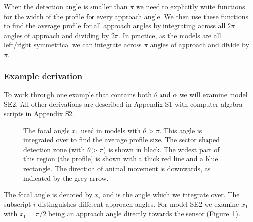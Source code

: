 \documentclass[a4paper,10pt,reqno,oneside]{amsart}
\begin{document}
When the detection angle is smaller than $\pi$ we need to explicitly write functions for the width of the profile for every approach angle. We then use these functions to find the average profile for all approach angles by integrating across all $2\pi$ angles of approach and dividing by $2\pi$. In practice, as the models are all left/right symmetrical we can integrate across $\pi$ angles of approach and divide by $\pi$.

\subsubsection{Example derivation}

To work through one example that contains both $\theta$ and $\alpha$ we will examine model SE2. All other derivations are described in Appendix S1 with computer algebra scripts in Appendix S2. 
\begin{figure}[t]
        \centering
\caption{The focal angle $x_1$ used in models with $\theta>\pi$. This angle is integrated over to find the average profile size. The sector shaped detection zone (with $\theta>\pi$) is shown in black. The widest part of this region (the profile) is shown with a thick red line and a blue rectangle. The direction of animal movement is downwards, as indicated by the grey arrow. 
     }
\label{f:x1}
\end{figure}

The focal angle is denoted by $x_i$ and is the angle which we integrate over. The subscript $i$ distinguishes different approach angles. For model SE2 we examine $x_1$ with  $x_1 = \pi/2$ being an approach angle directly towards the sensor (Figure~\ref{f:x1}). 
\end{document}
